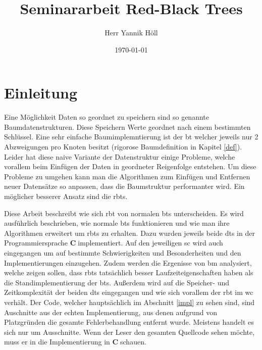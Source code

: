 \documentclass[11pt]{article}
\title{\textbf{Seminararbeit Red-Black Trees}}
\author{Herr Yannik Höll}
\date{\today}
\newcommand{\cpl}{\textbf{C}$\;$}
\begin{document}
\begin{titlingpage}
    \maketitle
\end{titlingpage}
\pagebreak

\tableofcontents
\pagebreak

\listoffigures
\pagebreak

\glsaddall
\printglossary
\pagebreak

\section{Einleitung}


Eine Möglichkeit Daten so geordnet zu speichern sind so genannte Baumdatenstrukturen. Diese Speichern Werte geordnet nach einem bestimmten Schlüssel.
Eine sehr einfache Baumimplemntierung ist der \gls{bt} welcher jeweils nur 2 Abzweigungen pro Knoten besitzt (rigorose Baumdefinition in Kapitel \ref{def}).
Leider hat diese naive Variante der Datenstruktur einige Probleme, welche vorallem beim Einfügen der Daten in geordneter Reigenfolge entstehen.
Um diese Probleme zu umgehen kann man die Algorithmen zum Einfügen und Entfernen neuer Datensätze so anpassen, dass die Baumstruktur performanter wird.
Ein möglicher besserer Ansatz sind die \glspl{rbt}.

Diese Arbeit beschreibt wie sich \gls{rbt} von normalen \glspl{bt} unterscheiden. Es wird ausführlich beschrieben, wie normale \glspl{bt} funktionieren und wie man
ihre Algorithmen erweitert um \glspl{rbt} zu erhalten.
Dazu wurden jeweils beide \glspl{dt} in der Programmiersprache \cpl implementiert. Auf den jeweiligen \gls{sc} wird auch eingegangen um auf bestimmte Schwierigkeiten und Besonderheiten und den Implementierungen einzugehen.
Zudem werden die Ergenisse von \gls{bm} analysiert, welche zeigen sollen, dass \glspl{rbt} tatsächlich besser Laufzeiteigenschaften haben als
die Standimplementierung der \glspl{bt}.
Außerdem wird auf die Speicher- und Zeitkomplexität der beiden \glspl{dt} eingegangen und wie sich vorallem der \gls{rbt} im \gls{wc} verhält.
Der Code, welcher hauptsächlich im Abschnitt \ref{impl} zu sehen sind, sind Auschnitte aus der echten Implementierung, 
aus denen aufgrund von Platzgründen die gesamte Fehlerbehandlung entfernt wurde. Meistens handelt es sich nur um Ausschnitte. 
Wenn der Leser den gesamten Quellcode sehen möchte, muss er in die Implementierung in \cpl schauen. 
\end{document}
